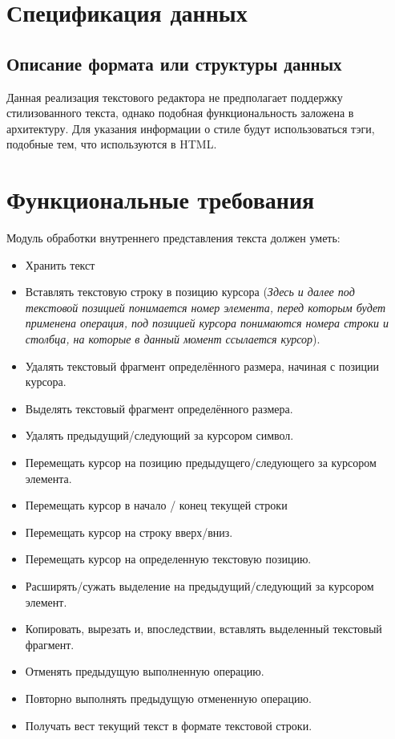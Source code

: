\documentclass{fefu}
\begin{document}
	\section{Спецификация данных}
		\subsection{Описание формата или структуры данных}
			\par Данная реализация текстового редактора не предполагает поддержку
			стилизованного текста, однако подобная функциональность заложена в архитектуру.
			Для указания информации о стиле будут использоваться тэги, подобные тем, что
			используются в HTML.
	\section{Функциональные требования}
		\par Модуль обработки внутреннего представления текста должен уметь:
		\begin{itemize}
			\item Хранить текст
			\item Вставлять текстовую строку в позицию курсора (\textit{Здесь и далее под текстовой позицией 
			понимается номер элемента, перед которым будет применена операция, под
			позицией курсора понимаются номера строки и столбца, на которые в данный момент
			ссылается курсор}).
			\item Удалять текстовый фрагмент определённого размера, 
			начиная с позиции курсора.
			\item Выделять текстовый фрагмент определённого размера.
			\item Удалять предыдущий/следующий за курсором символ.
			\item Перемещать курсор на позицию предыдущего/следующего
			за курсором элемента.
			\item Перемещать курсор в начало / конец текущей строки
			\item Перемещать курсор на строку вверх/вниз.
			\item Перемещать курсор на определенную текстовую позицию.
			\item Расширять/сужать выделение на предыдущий/следующий за курсором элемент.
			\item Копировать, вырезать и, впоследствии, вставлять выделенный текстовый 
			фрагмент.
			\item Отменять предыдущую выполненную операцию.
			\item Повторно выполнять предыдущую отмененную операцию.
			\item Получать вест текущий текст в формате текстовой 
			строки.
		\end{itemize}
\end{document}
